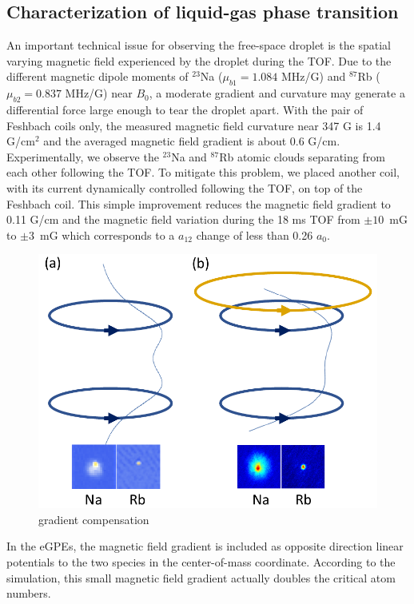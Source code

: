 \subsection{Characterization of liquid-gas phase transition}

An important technical issue for observing the free-space droplet is the spatial varying magnetic field experienced by the droplet during the TOF. 
Due to the different magnetic dipole moments of $^{23}$Na ($\mu_{b1} = 1.084$ MHz/G) and $^{87}$Rb ($\mu_{b2} = 0.837$ MHz/G) near $B_0$, a moderate gradient and curvature may generate a differential force large enough to tear the droplet apart. With the pair of Feshbach coils only, the measured magnetic field curvature near 347 G is 1.4 G/cm$^2$ and the averaged magnetic field gradient is about 0.6 G/cm. Experimentally, we observe the $^{23}$Na and $^{87}$Rb atomic clouds separating from each other following the TOF. To mitigate this problem, we placed another coil, with its current dynamically controlled following the TOF, on top of the Feshbach coil.
This simple improvement reduces the magnetic field gradient to 0.11 G/cm and the magnetic field variation during the 18 ms TOF from $\pm 10$~mG to 
$\pm 3$~mG which corresponds to a $a_{12}$ change of less than 0.26 $a_0$.


\begin{figure}[hb]
\begin{center}
\includegraphics[width = 0.8\linewidth]{figures/gradient_compensation.pdf}
\end{center}
\caption{gradient compensation}
\label{gradient_compensation}
\end{figure}

In the eGPEs, the magnetic field gradient is included as opposite direction linear potentials to the two species in the center-of-mass coordinate. 
According to the simulation, this small magnetic field gradient actually doubles the critical atom numbers.

